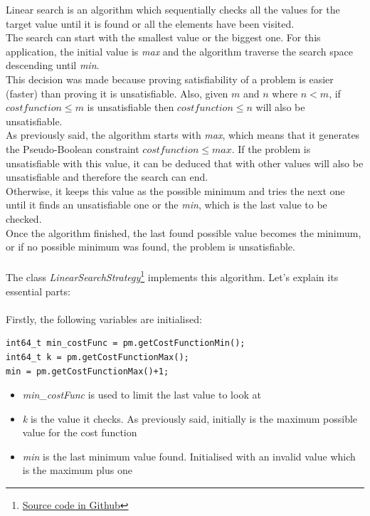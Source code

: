 Linear search is an algorithm which sequentially checks all the values for the target value until it is found or all the elements have been visited.\\
The search can start with the smallest value or the biggest one. For this application, the initial value is \emph{max} and the algorithm traverse the search space descending until \emph{min}.\\
This decision was made because proving satisfiability of a problem is easier (faster) than proving it is unsatisfiable. Also, given $m$ and $n$ where $n < m$, if $cost function \leq m$ is unsatisfiable then $cost function \leq n$ will also be unsatisfiable. \\
As previously said, the algorithm starts with \emph{max}, which means that it generates the Pseudo-Boolean constraint $cost function \leq max$. If the problem is unsatisfiable with this value, it can be deduced that with other values will also be unsatisfiable and therefore the search can end.\\
Otherwise, it keeps this value as the possible minimum and tries the next one until it finds an unsatisfiable one or the \emph{min}, which is the last value to be checked.\\
Once the algorithm finished, the last found possible value becomes the minimum, or if no possible minimum was found, the problem is unsatisfiable.\\\\
The class \emph{LinearSearchStrategy}\footnote{\href{https://github.com/marcbenedi/SAT-tfg/blob/master/source_files/LinearSearchStrategy.cpp}{Source code in Github}} implements this algorithm. Let's explain its essential parts:\\\\
Firstly, the following variables are initialised:
\begin{verbatim}
int64_t min_costFunc = pm.getCostFunctionMin();
int64_t k = pm.getCostFunctionMax();
min = pm.getCostFunctionMax()+1;
\end{verbatim}
\begin{itemize}
	\item \emph{min\_costFunc} is used to limit the last value to look at
	\item \emph{k} is the value it checks. As previously said, initially is the maximum possible value for the cost function
	\item \emph{min} is the last minimum value found. Initialised with an invalid value which is the maximum plus one
\end{itemize}
